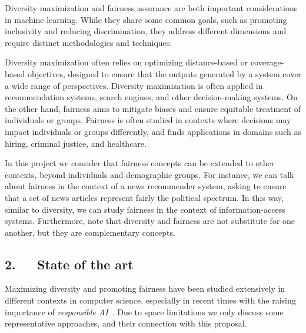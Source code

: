 \documentclass[a4paper,11pt]{article}
\begin{document}
Diversity maximization and fairness assurance are both important considerations in machine learning.
While they share some common goals, such as promoting inclusivity and reducing discrimination, 
they address different dimensions and require distinct methodologies and techniques. 

Diversity maximization often relies on optimizing distance-based or coverage-based objectives, 
designed to ensure that the outputs generated by a system cover a wide range of perspectives. 
Diversity maxi\-mi\-za\-tion is often applied in recommendation systems, search engines, 
and other decision-making systems. 
%
On the other hand, 
fairness aims to mitigate biases and ensure equitable treatment of individuals or groups.
Fairness is often studied in contexts where decisions may impact individuals or groups differently, 
and finds applications in domains such as hiring, criminal justice, and healthcare.

In this project we consider that fairness concepts can be extended to other contexts,  
beyond individuals and demographic groups. 
For instance, we can talk about fairness in the context of a news recommender system, 
asking to ensure that a set of news articles represent fairly the political spectrum.
In this way, similar to diversity, we can study fairness in the context of information-access systems.
Furthermore, note that diversity and fairness are not substitute for one another, 
but they are complementary concepts.

\subsection*{2.~~~State of the art}

Maximizing diversity and promoting fairness have been studied 
extensively in different contexts in computer science, 
especially in recent times with the raising importance of \emph{responsible AI}~\cite{dignum2019responsible}.
Due to space limitations we only discuss some representative approaches, 
and their connection with this proposal.

\end{document}
